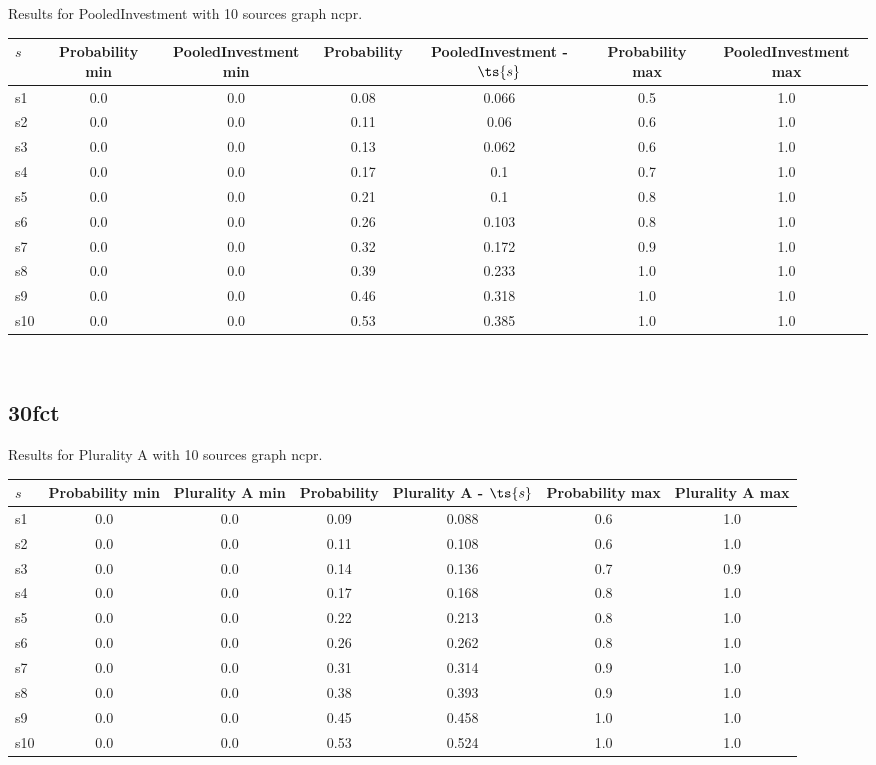 \documentclass{article}
\begin{document}
\noindent Results for PooledInvestment with 10 sources graph ncpr.

\noindent\begin{tabular}{|l|c|c|c|c|c|c|}
\hline
$s$& Probability min & PooledInvestment min & Probability & PooledInvestment - $\ts{s}$ & Probability max & PooledInvestment max\\
\hline
s1 &0.0 & 0.0 & 0.08 & 0.066 & 0.5 & 1.0\\
\hline
s2 &0.0 & 0.0 & 0.11 & 0.06 & 0.6 & 1.0\\
\hline
s3 &0.0 & 0.0 & 0.13 & 0.062 & 0.6 & 1.0\\
\hline
s4 &0.0 & 0.0 & 0.17 & 0.1 & 0.7 & 1.0\\
\hline
s5 &0.0 & 0.0 & 0.21 & 0.1 & 0.8 & 1.0\\
\hline
s6 &0.0 & 0.0 & 0.26 & 0.103 & 0.8 & 1.0\\
\hline
s7 &0.0 & 0.0 & 0.32 & 0.172 & 0.9 & 1.0\\
\hline
s8 &0.0 & 0.0 & 0.39 & 0.233 & 1.0 & 1.0\\
\hline
s9 &0.0 & 0.0 & 0.46 & 0.318 & 1.0 & 1.0\\
\hline
s10 &0.0 & 0.0 & 0.53 & 0.385 & 1.0 & 1.0\\
\hline
\end{tabular}\\

\newpage

\subsection{30fct}

\noindent Results for Plurality A with 10 sources graph ncpr.

\noindent\begin{tabular}{|l|c|c|c|c|c|c|}
\hline
$s$& Probability min & Plurality A min & Probability & Plurality A - $\ts{s}$ & Probability max & Plurality A max\\
\hline
s1 &0.0 & 0.0 & 0.09 & 0.088 & 0.6 & 1.0\\
\hline
s2 &0.0 & 0.0 & 0.11 & 0.108 & 0.6 & 1.0\\
\hline
s3 &0.0 & 0.0 & 0.14 & 0.136 & 0.7 & 0.9\\
\hline
s4 &0.0 & 0.0 & 0.17 & 0.168 & 0.8 & 1.0\\
\hline
s5 &0.0 & 0.0 & 0.22 & 0.213 & 0.8 & 1.0\\
\hline
s6 &0.0 & 0.0 & 0.26 & 0.262 & 0.8 & 1.0\\
\hline
s7 &0.0 & 0.0 & 0.31 & 0.314 & 0.9 & 1.0\\
\hline
s8 &0.0 & 0.0 & 0.38 & 0.393 & 0.9 & 1.0\\
\hline
s9 &0.0 & 0.0 & 0.45 & 0.458 & 1.0 & 1.0\\
\hline
s10 &0.0 & 0.0 & 0.53 & 0.524 & 1.0 & 1.0\\
\hline
\end{tabular}\\
\end{document}
